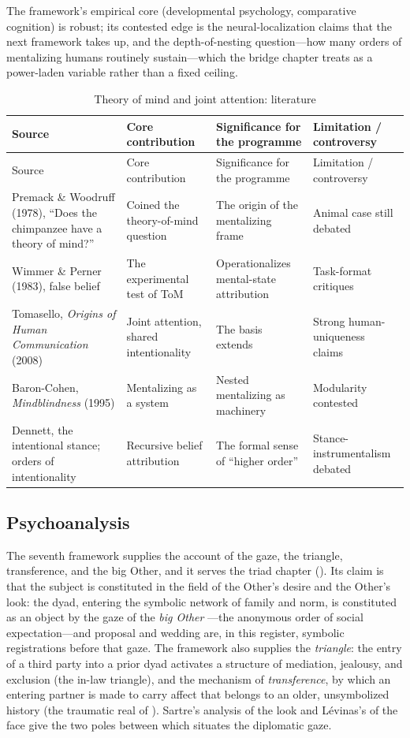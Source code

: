 The framework's empirical core (developmental psychology, comparative cognition) is robust; its contested edge is the neural-localization claims that the next framework takes up, and the depth-of-nesting question---how many orders of mentalizing humans routinely sustain---which the bridge chapter treats as a power-laden variable rather than a fixed ceiling.

\goldrule
\footnotesize
\begin{longtable}{Y Y Y Y}
\caption{Theory of mind and joint attention: literature}\label{p07:tab:lit-tom}\\
\toprule
{}
Source & Core contribution & Significance for the programme & Limitation / controversy \\
\midrule
\endfirsthead
{}
Source & Core contribution & Significance for the programme & Limitation / controversy \\
\midrule
\endhead
Premack \& Woodruff (1978), ``Does the chimpanzee have a theory of mind?'' & Coined the theory-of-mind question & The origin of the mentalizing frame & Animal case still debated \\
Wimmer \& Perner (1983), false belief & The experimental test of ToM & Operationalizes mental-state attribution & Task-format critiques \\
Tomasello, \emph{Origins of Human Communication} (2008) & Joint attention, shared intentionality & The basis  extends & Strong human-uniqueness claims \\
Baron-Cohen, \emph{Mindblindness} (1995) & Mentalizing as a system & Nested mentalizing as machinery & Modularity contested \\
Dennett, the intentional stance; orders of intentionality & Recursive belief attribution & The formal sense of ``higher order'' & Stance-instrumentalism debated \\
\bottomrule
\end{longtable}

\subsection{Psychoanalysis}
The seventh framework supplies the account of the gaze, the triangle, transference, and the big Other, and it serves the triad chapter (). Its claim is that the subject is constituted in the field of the Other's desire and the Other's look: the dyad, entering the symbolic network of family and norm, is constituted as an object by the gaze of the \emph{big Other} \parencite{lacan1964sem11}---the anonymous order of social expectation---and proposal and wedding are, in this register, symbolic registrations before that gaze. The framework also supplies the \emph{triangle}: the entry of a third party into a prior dyad activates a structure of mediation, jealousy, and exclusion (the in-law triangle), and the mechanism of \emph{transference}, by which an entering partner is made to carry affect that belongs to an older, unsymbolized history (the traumatic real of ). Sartre's analysis of the look \parencite{sartre1943} and Lévinas's of the face \parencite{levinas1961} give the two poles between which  situates the diplomatic gaze.

